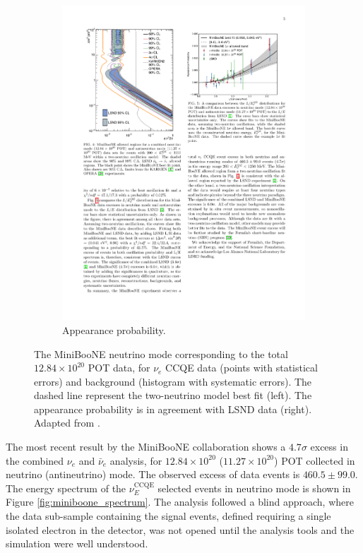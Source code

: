 \begin{figure}[htbp]
\begin{subfigure}{0.48\textwidth}
\begin{center}
    \includegraphics[width=\linewidth]{figures/miniboone_lsnd.pdf}
    \caption{Appearance probability.}
    \label{fig:miniboone_lsnd}
    \end{center}
  \end{subfigure}
  \caption{The MiniBooNE neutrino mode corresponding to the total $12.84\times10^{20}$ POT data, for $\nu_e$ CCQE data (points with statistical errors) and background (histogram with systematic errors). The dashed line represent the two-neutrino model best fit (left). The appearance probability is in agreement with LSND data (right). Adapted from \cite{Aguilar-Arevalo:2018gpe}.}
\end{figure}


The most recent result by the MiniBooNE collaboration \cite{Aguilar-Arevalo:2018gpe} shows a $4.7\sigma$ excess in the combined $\nu_{e}$ and $\bar{\nu}_{e}$ analysis, for $12.84\times10^{20}$ ($11.27\times10^{20}$) POT collected in neutrino (antineutrino) mode. The observed excess of data events is $460.5 \pm 99.0$. The energy spectrum of the $\nu_E^{\mathrm{CCQE}}$ selected events in neutrino mode is shown in Figure \ref{fig:miniboone_spectrum}. The analysis followed a blind approach, where the data sub-sample containing the signal events, defined requiring a single isolated electron in the detector, was not opened until the analysis tools and the simulation were well understood. 


